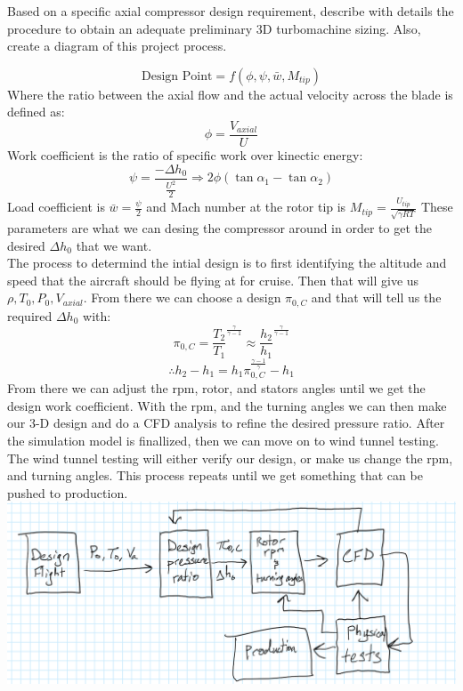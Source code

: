 \documentclass[12pt]{exam}
\begin{document}
\begin{questions}
\newpage 
\begin{question}
Based on a specific axial compressor design requirement, describe with details the procedure
to obtain an adequate preliminary 3D turbomachine sizing. Also, create a diagram of this
project process.
\end{question}
\begin{solutionorbox}[\stretch{1}]
\[
\text{Design Point} = f\left(\phi,\psi,\bar{w},M_{tip}\right)
\]
Where the ratio between the axial flow and the actual velocity across the blade is defined as: 
\[\phi = \frac{V_{axial}}{U}\]
Work coefficient is the ratio of specific work over kinectic energy:
\[\psi = \frac{-\Delta{h_0}}{\frac{U^2}{2}} \Rightarrow 2\phi \left(\tan{\alpha_1} - \tan{\alpha_2}\right)\]
Load coefficient is \(\bar{w} = \frac{\psi}{2}\) and Mach number at the rotor tip is \(M_{tip} = \frac{U_{tip}}{\sqrt{\gamma RT}}\)
These parameters are what we can desing the compressor around in order to get the desired \(\Delta{h_0}\) that we want.
\\
The process to determind the intial design is to first identifying the altitude and speed that the aircraft should be flying at for cruise.
Then that will give us \(\rho,T_0,P_0,V_{axial}\). From there we can choose a design \(\pi_{0,C}\) and that will tell us the required \(\Delta{h_0}\) with:
\[\pi_{0,C} = \frac{T_2}{T_1}^\frac{\gamma}{\gamma-1} \approx \frac{h_2}{h_1}^\frac{\gamma}{\gamma-1}\]
\[\therefore h_2 - h_1 = h_1 \pi_{0,C}^\frac{\gamma-1}{\gamma} - h_1\]
From there we can adjust the rpm, rotor, and stators angles until we get the design work coefficient. With
the rpm, and the turning angles we can then make our 3-D design and do a CFD analysis to refine the desired pressure ratio.
After the simulation model is finallized, then we can move on to wind tunnel testing. The wind tunnel testing will either verify our design, or
make us change the rpm, and turning angles. This process repeats until we get something that can be pushed to production.
\\
\includegraphics[width = \linewidth]{hand drawn production cycle.png}
\end{solutionorbox}



\end{questions}
\end{document}
